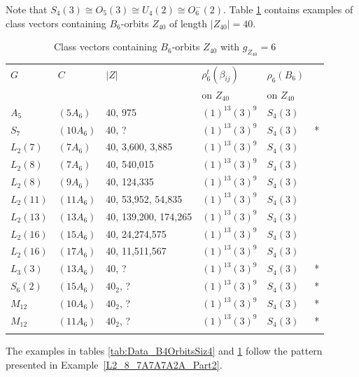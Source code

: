\documentclass[12pt,a4paper]{article}
\numberwithin{equation}{section}
\numberwithin{table}{section}
\begin{document}
%
\noindent
Note that $S_4(3) \cong O_5(3) \cong U_4(2) \cong O_6^-(2)$.
Table \ref{tab:Data_B6OrbitsSiz40} contains examples of class vectors containing $B_6$-orbits $Z_{40}$
of length $\vert Z_{40} \vert = 40$.
%
\begin{table}[H]
\centering
\footnotesize
\captionsetup{font=footnotesize}
\caption{Class vectors containing $B_6$-orbits $Z_{40}$ with $g_{Z_{40}} = 6$}
\label{tab:Data_B6OrbitsSiz40}
\begin{tabular}{llllll}
\hline\noalign{\smallskip}
$G$       & $C$                         & $ \vert Z \vert $ & $\rho^t_6(\beta_{ij})$ & $\rho_6(B_6)$ & \\
          &                             &                   & on $Z_{40}$            & on $Z_{40}$ & \\
\noalign{\smallskip}\hline\noalign{\smallskip}
$A_5$     & $(5A_6)$       &  40, 975 & $(1)^{13} (3)^9$ & $S_4(3)$ & \\
$S_7$     & $(10A_6)$ &  40, ? & $(1)^{13} (3)^9$ & $S_4(3)$ & *\\
$L_2(7)$  & $(7A_6)$       &  40, 3,600, 3,885 & $(1)^{13} (3)^9$ & $S_4(3)$ & \\
$L_2(8)$  & $(7A_6)$       &  40, 540,015 & $(1)^{13} (3)^9$ & $S_4(3)$ & \\
$L_2(8)$  & $(9A_6)$       &  40, 124,335 & $(1)^{13} (3)^9$ & $S_4(3)$ & \\
$L_2(11)$ & $(11A_6)$ &  40, 53,952, 54,835 & $(1)^{13} (3)^9$ & $S_4(3)$ & \\
$L_2(13)$ & $(13A_6)$ &  40, 139,200, 174,265 & $(1)^{13} (3)^9$ & $S_4(3)$ & \\
$L_2(16)$ & $(15A_6)$ &  40, 24,274,575 & $(1)^{13} (3)^9$ & $S_4(3)$ & \\
$L_2(16)$ & $(17A_6)$ &  40, 11,511,567 & $(1)^{13} (3)^9$ & $S_4(3)$ & \\
$L_3(3)$  & $(13A_6)$ &  40, ? & $(1)^{13} (3)^9$ & $S_4(3)$ & *\\
$S_6(2)$  & $(15A_6)$ &  $40_2$, ? & $(1)^{13} (3)^9$ & $S_4(3)$ & *\\
$M_{12}$  & $(10A_6)$ &  $40_2$, ? & $(1)^{13} (3)^9$ & $S_4(3)$ & *\\
$M_{12}$  & $(11A_6)$ &  $40_2$, ? & $(1)^{13} (3)^9$ & $S_4(3)$ & *\\
\noalign{\smallskip}\hline
\end{tabular}
\end{table}
%
\noindent
The examples in tables \ref{tab:Data_B4OrbitsSiz4} and \ref{tab:Data_B6OrbitsSiz40} follow the pattern presented in Example~\ref{L2_8_7A7A7A2A_Part2}.
\end{document}
